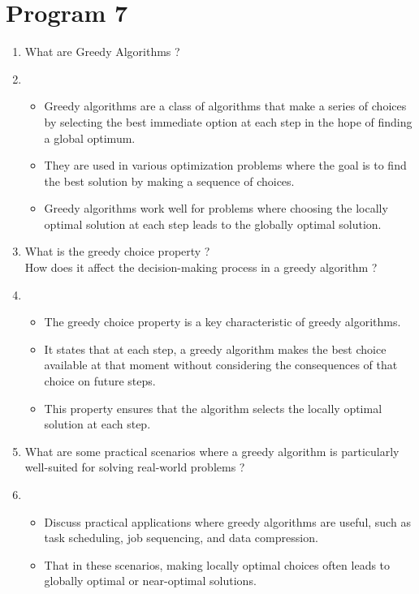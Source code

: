 ﻿\documentclass{article}
\newcommand{\answer}{\item [$\rightarrow$]}
\begin{document}
	\section*{Program 7}  
	\begin{enumerate}
		\item What are Greedy Algorithms ?
		\answer \begin{itemize}
			\item Greedy algorithms are a class of algorithms that make a series of choices by selecting the best immediate option at each step in the hope of finding a global optimum.
			\item They are used in various optimization problems where the goal is to find the best solution by making a sequence of choices.
			\item Greedy algorithms work well for problems where choosing the locally optimal solution at each step leads to the globally optimal solution.
		\end{itemize}
		
		\item What is the greedy choice property ? \\
		How does it affect the decision-making process in a greedy algorithm ?
		\answer \begin{itemize}
			\item The greedy choice property is a key characteristic of greedy algorithms.
			\item It states that at each step, a greedy algorithm makes the best choice available at that moment without considering the consequences of that choice on future steps.
			\item This property ensures that the algorithm selects the locally optimal solution at each step.
		\end{itemize}
		
		\item What are some practical scenarios where a greedy algorithm is particularly well-suited for solving real-world problems ?
		\answer \begin{itemize}
			\item Discuss practical applications where greedy algorithms are useful, such as task scheduling, job sequencing, and data compression.
			\item That in these scenarios, making locally optimal choices often leads to globally optimal or near-optimal solutions.
		\end{itemize}
	\end{enumerate}
\end{document}
